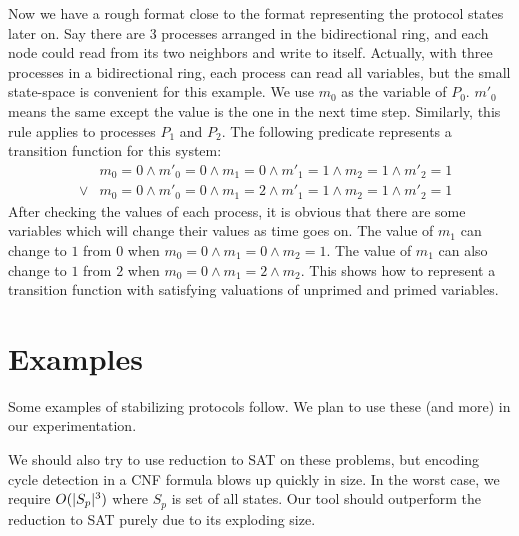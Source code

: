 Now we have a rough format close to the format representing the protocol states later on. Say there are 3 processes arranged in the bidirectional ring, and each node could read from its two neighbors and write to itself. Actually, with three processes in a bidirectional ring, each process can read all variables, but the small state-space is convenient for this example. We use $m_0$ as the variable of $P_0$. $m'_0$ means the same except the value is the one in the next time step. Similarly, this rule applies to processes $P_1$ and $P_2$. The following predicate represents a transition function for this system:
\begin{eqnarray*}
 & & m_0 = 0 \wedge m'_0 = 0 \wedge m_1 = 0 \wedge m'_1 = 1 \wedge m_2 = 1 \wedge m'_2 = 1 \\
 & \vee & m_0 = 0 \wedge m'_0 = 0 \wedge m_1 = 2 \wedge m'_1 = 1 \wedge m_2 = 1 \wedge m'_2 = 1
\end{eqnarray*}
After checking the values of each process, it is obvious that there are some variables which will change their values as time goes on. The value of $m_1$ can change to $1$ from $0$ when $m_0 = 0 \wedge m_1 = 0 \wedge m_2 = 1$. The value of $m_1$ can also change to $1$ from $2$ when $m_0 = 0 \wedge m_1 = 2 \wedge m_2$. This shows how to represent a transition function with satisfying valuations of unprimed and primed variables.


\section{Examples}
Some examples of stabilizing protocols follow.
We plan to use these (and more) in our experimentation.

We should also try to use reduction to SAT on these problems, but encoding cycle detection in a CNF formula blows up quickly in size.
In the worst case, we require $O(\lvert S_p\rvert^3)$ where $S_p$ is set of all states.
Our tool should outperform the reduction to SAT purely due to its exploding size.

